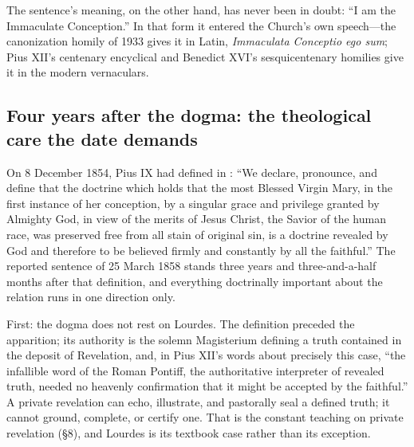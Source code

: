 The sentence's meaning, on the other hand, has never been in
doubt: ``I am the Immaculate Conception.'' In that form it entered
the Church's own speech---the canonization homily of 1933 gives it
in Latin, \emph{Immaculata Conceptio ego sum}; Pius XII's
centenary encyclical and Benedict XVI's sesquicentenary homilies
give it in the modern vernaculars.

\subsection{Four years after the dogma: the theological care the
date demands}

On 8 December 1854, Pius IX had defined in : ``We declare, pronounce, and define that the doctrine
which holds that the most Blessed Virgin Mary, in the first
instance of her conception, by a singular grace and privilege
granted by Almighty God, in view of the merits of Jesus Christ,
the Savior of the human race, was preserved free from all stain
of original sin, is a doctrine revealed by God and therefore to
be believed firmly and constantly by all the faithful.'' The reported
sentence of 25 March 1858 stands three years and three-and-a-half
months after that definition, and everything doctrinally important
about the relation runs in one direction only.

First: the dogma does not rest on Lourdes. The definition preceded
the apparition; its authority is the solemn Magisterium defining a
truth contained in the deposit of Revelation, and, in Pius XII's
words about precisely this case, ``the infallible word of the Roman
Pontiff, the authoritative interpreter of revealed truth, needed no
heavenly confirmation that it might be accepted by the
faithful.'' A private
revelation can echo, illustrate, and pastorally seal a defined
truth; it cannot ground, complete, or certify one. That is the
constant teaching on private revelation (\S8), and Lourdes is its
textbook case rather than its exception.

